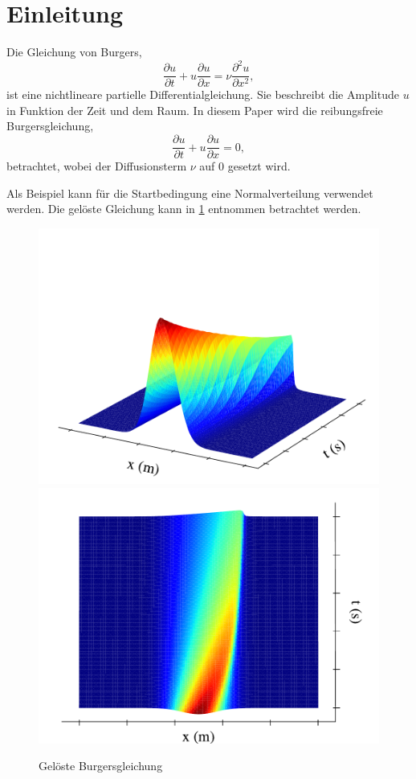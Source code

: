 %
%
\section{Einleitung \label{burgers:section:einleitung}}
	
	Die Gleichung von Burgers,
	\begin{equation}
		  \frac {\partial u}{\partial t}+u{\frac {\partial u}{\partial x}}=\nu {\frac {\partial ^{2}u}{\partial x^{2}}},
		  \label{burgers:eq_burgers}
	\end{equation}
	ist eine nichtlineare partielle Differentialgleichung.
	Sie beschreibt die Amplitude $u$ in Funktion der Zeit und dem Raum.
	In diesem Paper wird die reibungsfreie Burgersgleichung, 
	\begin{equation}
		\frac {\partial u}{\partial t}+u{\frac {\partial u}{\partial x}}=0,
		\label{burgers:eq_invisid_burgers}
	\end{equation}
	betrachtet, wobei der Diffusionsterm $\nu$ auf 0 gesetzt wird.
	
	Als Beispiel kann f\"ur die Startbedingung eine Normalverteilung verwendet werden.
	Die gel\"oste Gleichung kann in \ref{burgers:fig:b1} entnommen betrachtet werden.
	
	    \begin{figure}
		\centering
		\includegraphics[width=.49\textwidth]{papers/burgers/BurgersEquation/images/Implicit_front.pdf}
		\includegraphics[width=.49\textwidth]{papers/burgers/BurgersEquation/images/Implicit_top.pdf}
		\caption{Gel\"oste Burgersgleichung}
		\label{burgers:fig:b1}
		\end{figure}
	
